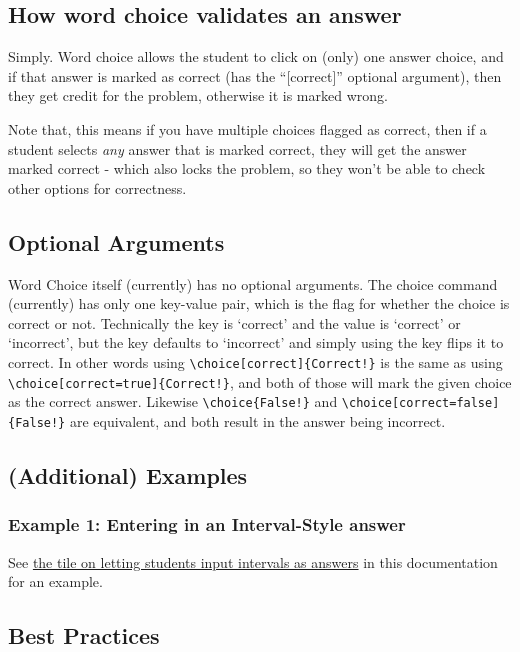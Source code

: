 \documentclass{ximera}
\begin{document}
    \subsection*{How word choice validates an answer}
    
        Simply. Word choice allows the student to click on (only) one answer choice, and if that answer is marked as correct (has the ``[correct]'' optional argument), then they get credit for the problem, otherwise it is marked wrong.
        
        Note that, this means if you have multiple choices flagged as correct, then if a student selects \textit{any} answer that is marked correct, they will get the answer marked correct - which also locks the problem, so they won't be able to check other options for correctness.

    \subsection*{Optional Arguments}
        
        Word Choice itself (currently) has no optional arguments. The choice command (currently) has only one key-value pair, which is the flag for whether the choice is correct or not. Technically the key is `correct' and the value is `correct' or `incorrect', but the key defaults to `incorrect' and simply using the key flips it to correct. In other words using \verb|\choice[correct]{Correct!}| is the same as using \verb|\choice[correct=true]{Correct!}|, and both of those will mark the given choice as the correct answer. Likewise \verb|\choice{False!}| and \verb|\choice[correct=false]{False!}| are equivalent, and both result in the answer being incorrect.

    \subsection*{(Additional) Examples}
    
        \subsubsection*{Example 1: Entering in an Interval-Style answer}
            See \href{https://xronos.clas.ufl.edu/examples/exampleCore/problemDesign/intervals}{the tile on letting students input intervals as answers} in this documentation for an example.
        
    \subsection*{Best Practices}
    
\end{document}
